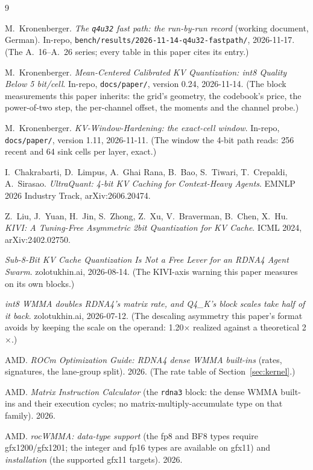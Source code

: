 \documentclass[10pt,twocolumn]{article}
\begin{document}
\begin{thebibliography}{9}

M.~Kronenberger.
\emph{The \texttt{q4u32} fast path: the run-by-run record} (working document, German).
In-repo, \texttt{bench/results/2026-11-14-q4u32-fastpath/}, 2026-11-17.
(The A.~16--A.~26 series; every table in this paper cites its entry.)

M.~Kronenberger.
\emph{Mean-Centered Calibrated KV Quantization: int8 Quality Below 5 bit/cell}.
In-repo, \texttt{docs/paper/}, version 0.24, 2026-11-14.
(The block measurements this paper inherits: the grid's geometry, the codebook's price, the
power-of-two step, the per-channel offset, the moments and the channel probe.)

M.~Kronenberger.
\emph{KV-Window-Hardening: the exact-cell window}.
In-repo, \texttt{docs/paper/}, version 1.11, 2026-11-11.
(The window the 4-bit path reads: 256 recent and 64 sink cells per layer, exact.)

I.~Chakrabarti, D.~Limpus, A.~Ghai Rana, B.~Bao, S.~Tiwari, T.~Crepaldi, A.~Sirasao.
\emph{UltraQuant: 4-bit KV Caching for Context-Heavy Agents}.
EMNLP 2026 Industry Track, arXiv:2606.20474.

Z.~Liu, J.~Yuan, H.~Jin, S.~Zhong, Z.~Xu, V.~Braverman, B.~Chen, X.~Hu.
\emph{KIVI: A Tuning-Free Asymmetric 2bit Quantization for KV Cache}.
ICML 2024, arXiv:2402.02750.

\emph{Sub-8-Bit KV Cache Quantization Is Not a Free Lever for an RDNA4 Agent Swarm}.
zolotukhin.ai, 2026-08-14. (The KIVI-axis warning this paper measures on its own blocks.)

\emph{int8 WMMA doubles RDNA4's matrix rate, and Q4\_K's block scales take half of it back}.
zolotukhin.ai, 2026-07-12. (The descaling asymmetry this paper's format avoids by keeping the scale on
the operand: 1.20$\times$ realized against a theoretical 2$\times$.)

AMD.
\emph{ROCm Optimization Guide: RDNA4 dense WMMA built-ins} (rates, signatures, the lane-group split).
2026. (The rate table of Section~\ref{sec:kernel}.)

AMD.
\emph{Matrix Instruction Calculator} (the \texttt{rdna3} block: the dense WMMA built-ins and their
execution cycles; no matrix-multiply-accumulate type on that family). 2026.

AMD.
\emph{rocWMMA: data-type support} (the fp8 and BF8 types require gfx1200/gfx1201; the integer and fp16
types are available on gfx11) and \emph{installation} (the supported gfx11 targets). 2026.


\end{thebibliography}
\end{document}
